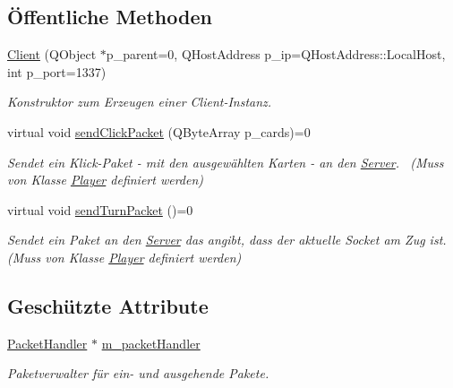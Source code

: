 \subsection*{Öffentliche Methoden}
\begin{DoxyCompactItemize}
\item 
\hyperlink{class_client_ade80139efef3b5a858968ccf20563709}{Client} (Q\+Object $\ast$p\+\_\+parent=0, Q\+Host\+Address p\+\_\+ip=Q\+Host\+Address\+::\+Local\+Host, int p\+\_\+port=1337)
\begin{DoxyCompactList}\small\item\em Konstruktor zum Erzeugen einer Client-\/\+Instanz. \end{DoxyCompactList}\item 
virtual void \hyperlink{class_client_ac3b60506d2f900a3490a05425f392914}{send\+Click\+Packet} (Q\+Byte\+Array p\+\_\+cards)=0
\begin{DoxyCompactList}\small\item\em Sendet ein Klick-\/\+Paket -\/ mit den ausgewählten Karten -\/ an den \hyperlink{class_server}{Server}.~\newline
 (Muss von Klasse \hyperlink{class_player}{Player} definiert werden) \end{DoxyCompactList}\item 
virtual void \hyperlink{class_client_a62fc6262c8e9f0e9a0b2811a9c6fa8b0}{send\+Turn\+Packet} ()=0
\begin{DoxyCompactList}\small\item\em Sendet ein Paket an den \hyperlink{class_server}{Server} das angibt, dass der aktuelle Socket am Zug ist.~\newline
 (Muss von Klasse \hyperlink{class_player}{Player} definiert werden) \end{DoxyCompactList}\end{DoxyCompactItemize}
\subsection*{Geschützte Attribute}
\begin{DoxyCompactItemize}
\item 
\hyperlink{class_packet_handler}{Packet\+Handler} $\ast$ \hyperlink{class_client_a4f9222fa01234b1ebdbe909f13e15744}{m\+\_\+packet\+Handler}
\begin{DoxyCompactList}\small\item\em Paketverwalter für ein-\/ und ausgehende Pakete. \end{DoxyCompactList}\end{DoxyCompactItemize}


